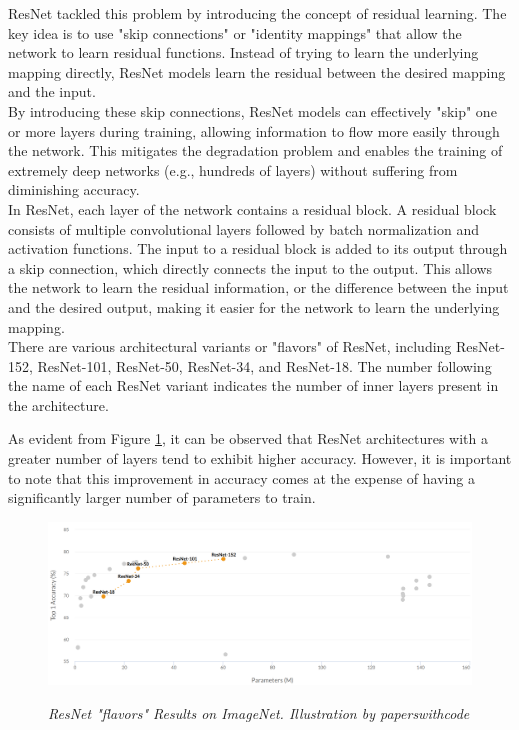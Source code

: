 ResNet tackled this problem by introducing the concept of residual learning.
The key idea is to use "skip connections" or "identity mappings" that allow the
network to learn residual functions. Instead of trying to learn the underlying
mapping directly, ResNet models learn the residual between the desired mapping
and the input. \\

By introducing these skip connections, ResNet models can effectively "skip" one
or more layers during training, allowing information to flow more easily
through the network. This mitigates the degradation problem and enables the
training of extremely deep networks (e.g., hundreds of layers) without
suffering from diminishing accuracy. \\

In ResNet, each layer of the network contains a residual block. A residual
block consists of multiple convolutional layers followed by batch normalization
and activation functions. The input to a residual block is added to its output
through a skip connection, which directly connects the input to the output.
This allows the network to learn the residual information, or the difference
between the input and the desired output, making it easier for the network to
learn the underlying mapping.  \\

There are various architectural variants or "flavors" of ResNet, including
ResNet-152,  ResNet-101,  ResNet-50,  ResNet-34, and  ResNet-18. The
number following the name of each ResNet variant indicates the number of inner
layers present in the architecture.

\newpage

As evident from Figure \ref{fig:resnet}, it can be observed that
ResNet architectures with a greater number of layers tend to exhibit higher
accuracy. However, it is important to note that this improvement in accuracy
comes at the expense of having a significantly larger number of parameters to
train.


\begin{figure}[H]
  \begin{adjustbox}{width=\textwidth, trim={0pt 0pt 1cm 0pt}, clip}
    \centering
    \includegraphics[width=\textwidth]{imatges/preliminaries/ResNetImageNet.png}
  \end{adjustbox}
  \caption[ResNet "flavors" Results on ImageNet]{\textit{ResNet "flavors" Results on ImageNet. Illustration by paperswithcode}}
  {\label{fig:resnet}}
\end{figure}

